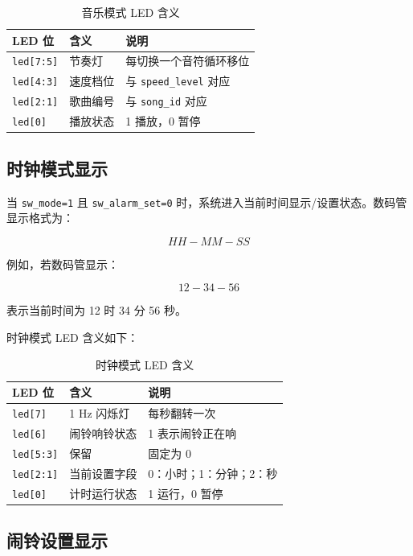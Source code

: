 \documentclass[UTF8,a4paper,12pt]{ctexart}
\newcommand{\port}[1]{\texttt{#1}}
\begin{document}
\begin{table}[H]
  \centering
  \caption{音乐模式 LED 含义}
  \begin{tabular}{lll}
    \toprule
    LED 位 & 含义 & 说明 \\
    \midrule
    \port{led[7:5]} & 节奏灯 & 每切换一个音符循环移位 \\
    \port{led[4:3]} & 速度档位 & 与 \port{speed\_level} 对应 \\
    \port{led[2:1]} & 歌曲编号 & 与 \port{song\_id} 对应 \\
    \port{led[0]} & 播放状态 & 1 播放，0 暂停 \\
    \bottomrule
  \end{tabular}
\end{table}

\subsection{时钟模式显示}

当 \port{sw\_mode=1} 且 \port{sw\_alarm\_set=0} 时，系统进入当前时间显示/设置状态。数码管显示格式为：

\[
HH-MM-SS
\]

例如，若数码管显示：

\[
12-34-56
\]

表示当前时间为 12 时 34 分 56 秒。

时钟模式 LED 含义如下：

\begin{table}[H]
  \centering
  \caption{时钟模式 LED 含义}
  \begin{tabular}{lll}
    \toprule
    LED 位 & 含义 & 说明 \\
    \midrule
    \port{led[7]} & 1 Hz 闪烁灯 & 每秒翻转一次 \\
    \port{led[6]} & 闹铃响铃状态 & 1 表示闹铃正在响 \\
    \port{led[5:3]} & 保留 & 固定为 0 \\
    \port{led[2:1]} & 当前设置字段 & 0：小时；1：分钟；2：秒 \\
    \port{led[0]} & 计时运行状态 & 1 运行，0 暂停 \\
    \bottomrule
  \end{tabular}
\end{table}

\subsection{闹铃设置显示}
\end{document}
